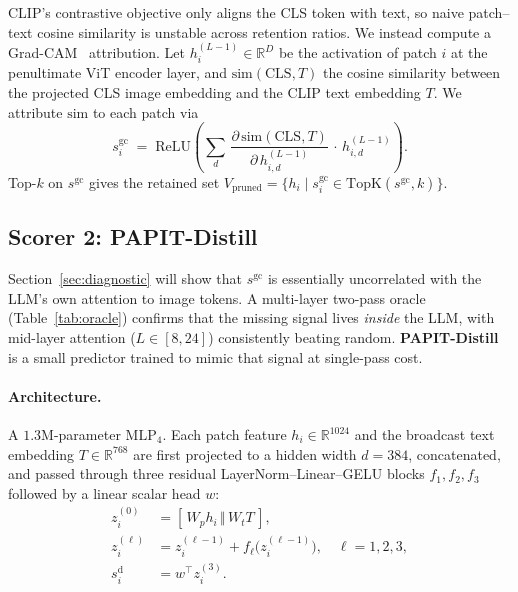 \documentclass[10pt,twocolumn,letterpaper]{article}
\begin{document}
CLIP's contrastive objective only aligns the CLS token with text, so
naive patch--text cosine similarity is unstable across retention ratios.
We instead compute a Grad-CAM~\cite{selvaraju2017gradcam} attribution.
Let $h^{(L-1)}_i\in\mathbb{R}^{D}$ be the activation of patch $i$ at the
penultimate ViT encoder layer, and $\text{sim}(\text{CLS},T)$ the cosine
similarity between the projected CLS image embedding and the CLIP text
embedding $T$. We attribute $\text{sim}$ to each patch via
\begin{equation}
  s^{\text{gc}}_i \;=\; \mathrm{ReLU}\!\left(
        \sum_{d}\, \frac{\partial\,\text{sim}(\text{CLS},T)}{\partial\, h^{(L-1)}_{i,d}}
                   \,\cdot\, h^{(L-1)}_{i,d}
        \right).
  \label{eq:gradcam}
\end{equation}
Top-$k$ on $s^{\text{gc}}$ gives the retained set
$V_{\text{pruned}}=\{h_i\mid s^{\text{gc}}_i\in\mathrm{TopK}(s^{\text{gc}},k)\}$.

\subsection{Scorer 2: PAPIT-Distill}
\label{sec:method-distill}

Section~\ref{sec:diagnostic} will show that $s^{\text{gc}}$ is essentially
uncorrelated with the LLM's own attention to image tokens. A
multi-layer two-pass oracle (Table~\ref{tab:oracle}) confirms that
the missing signal lives \emph{inside} the LLM, with mid-layer
attention ($L\!\in\![8,24]$) consistently beating random.
\textbf{PAPIT-Distill} is a small predictor trained to mimic that
signal at single-pass cost.

\paragraph{Architecture.}
A $1.3$M-parameter $\mathrm{MLP}_4$. Each patch feature
$h_i\in\mathbb{R}^{1024}$ and the broadcast text embedding
$T\in\mathbb{R}^{768}$ are first projected to a hidden width
$d{=}384$, concatenated, and passed through three residual
LayerNorm--Linear--GELU blocks $f_1,f_2,f_3$ followed by a linear
scalar head $w$:
\begin{equation}
\begin{aligned}
  z_i^{(0)} &= [\,W_p h_i \,\Vert\, W_t T\,], \\
  z_i^{(\ell)} &= z_i^{(\ell-1)} + f_\ell\bigl(z_i^{(\ell-1)}\bigr), \quad \ell=1,2,3, \\
  s^{\text{d}}_i &= w^\top z_i^{(3)}.
\end{aligned}
  \label{eq:distill}
\end{equation}
\end{document}
